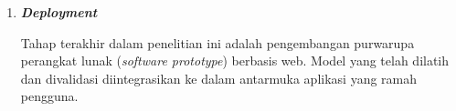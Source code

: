 \begin{enumerate}
    \item \textbf{\textit{Deployment}}
    
    Tahap terakhir dalam penelitian ini adalah pengembangan purwarupa perangkat lunak (\textit{software prototype}) berbasis web. Model yang telah dilatih dan divalidasi diintegrasikan ke dalam antarmuka aplikasi yang ramah pengguna. 
\end{enumerate}